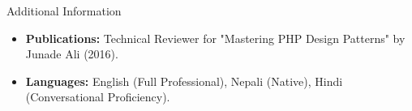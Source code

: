 \documentclass{resume} %
\begin{document}
\begin{rSection}{Additional Information} 
\begin{itemize}
    \itemsep -3pt {}
    \item \textbf{Publications:} Technical Reviewer for "Mastering PHP Design Patterns" by Junade Ali (2016).
    \item \textbf{Languages:} English (Full Professional), Nepali (Native), Hindi (Conversational Proficiency).
\end{itemize}
\end{rSection}
\end{document}
